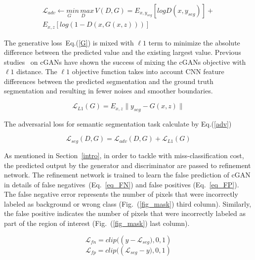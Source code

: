\documentclass[10pt,twocolumn,letterpaper]{article}
\begin{document}
\begin{equation} \label{eq_svGAN}
\begin{split}
\mathcal{L}_{adv} \leftarrow \underset{G} min \,  \underset{D } max \, V(D, G)
   = E_{x,y_{seg}} [log D(x,y_{seg})] + \\
     E_{x,z} [log (1-D(x, G(x,z)))]
\end{split}
\end{equation}

The generative loss~Eq.(\ref{G}) is mixed with $\ell1$ term to minimize the absolute difference between the predicted value and the existing largest value. Previous studies~\cite{Phillipimagetoimage2017,XueXZLH17} on cGANs have shown the success of mixing the cGANs objective with $\ell1$ distance.
The $\ell1$ objective function takes into account CNN feature differences between the predicted segmentation and the ground truth segmentation and resulting in fewer noises and smoother boundaries.

\begin{equation} \label{G}
 \mathcal{L}_{L1}(G) = E_{x,z} \parallel y_{seg} - G(x,z) \parallel
\end{equation}

The adversarial loss for semantic segmentation task calculate by Eq.(\ref{adv})

\begin{equation} \label{adv}
\mathcal{L}_{seg} (D, G) = \mathcal{L}_{adv} (D, G) + \mathcal{L}_{L1}(G)
\end{equation}

As mentioned in Section~\ref{intro}, in order to tackle with miss-classification cost, the predicted output by the generator and discriminator are passed to refinement network. The refinement network is trained to learn the false prediction of cGAN in details of false negatives~(Eq.~\ref{eq_FN}) and false positives (Eq.~\ref{eq_FP}).
The false negative error represents the number of pixels that were incorrectly labeled as background or wrong class (Fig.~(\ref{fig_mask}) third column). Similarly, the false positive indicates the number of pixels that were incorrectly labeled as part of the region of interest (Fig.~(\ref{fig_mask}) last column).

\begin{equation} \label{eq_FN}
\mathcal{L}_{fn} =  clip {((y - {\mathcal{L}_{seg} )}, 0, 1)}
\end{equation}\begin{equation} \label{eq_FP}
\mathcal{L}_{fp} =  clip {(({\mathcal{L}_{seg}- y)} , 0, 1)}
\end{equation}
\end{document}
